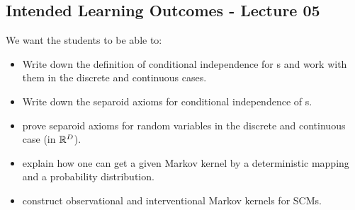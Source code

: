 \subsection*{Intended Learning Outcomes - Lecture 05}

We want the students to be able to:
\begin{itemize}
\item Write down the definition of conditional independence for \trv{}s 
    and work with them in the discrete and continuous cases.
\item Write down the separoid axioms for conditional independence of \trv{}s.
\item prove separoid axioms for random variables in the discrete and continuous case (in $\mathbb{R}^D$).
\item explain how one can get a given Markov kernel by a deterministic mapping and a probability distribution.
\item construct observational and interventional Markov kernels for SCMs.
\end{itemize}

